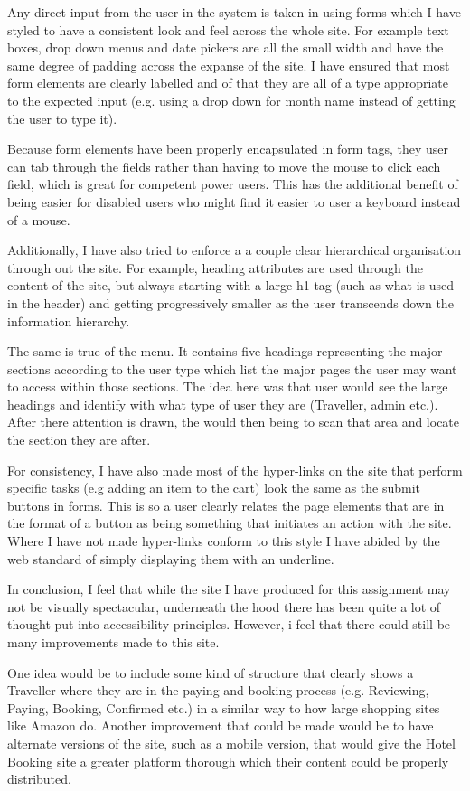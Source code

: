 \documentclass{article}
\begin{document}
Any direct input from the user in the system is taken in using forms which I have styled to have a consistent look and feel across the whole site. For example text boxes, drop down menus and date pickers are all the small width and have the same degree of padding across the expanse of the site. I have ensured that most form elements are clearly labelled and of that they are all of a type appropriate to the expected input (e.g. using a drop down for month name instead of getting the user to type it). 

Because form elements have been properly encapsulated in form tags, they user can tab through the fields rather than having to move the mouse to click each field, which is great for competent power users. This has the additional benefit of being easier for disabled users who might find it easier to user a keyboard instead of a mouse.

Additionally, I have also tried to enforce a a couple clear hierarchical organisation through out the site. For example, heading attributes are used through the content of the site, but always starting with a large h1 tag (such as what is used in the header) and getting progressively smaller as the user transcends down the information hierarchy. 

The same is true of the menu. It contains five headings representing the major sections according to the user type which list the major pages the user may want to access within those sections. The idea here was that user would see the large headings and identify with what type of user they are (Traveller, admin etc.). After there attention is drawn, the would then being to scan that area and locate the section they are after.

For consistency, I have also made most of the hyper-links on the site that perform specific tasks (e.g adding an item to the cart) look the same as the submit buttons in forms. This is so a user clearly relates the page elements that are in the format of a button as being something that initiates an action with the site. Where I have not made hyper-links conform to this style I have abided by the web standard of simply displaying them with an underline.

In conclusion, I feel that while the site I have produced for this assignment may not be visually spectacular, underneath the hood there has been quite a lot of thought put into accessibility principles. However, i feel that there could still be many improvements made to this site. 

One idea would be to include some kind of structure that clearly shows a Traveller where they are in the paying and booking process (e.g. Reviewing, Paying, Booking, Confirmed etc.) in a similar way to how large shopping sites like Amazon do. Another improvement that could be made would be to have alternate versions of the site, such as a mobile version, that would give the Hotel Booking site a greater platform thorough which their content could be properly distributed.
\end{document}
